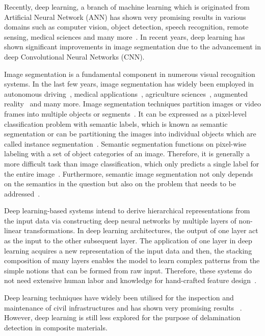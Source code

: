 Recently, deep learning, a branch of machine learning which is originated from Artificial Neural Network (ANN) has shown very promising results in various domains such as computer vision, object detection, speech recognition, remote sensing, medical sciences and many more~\cite{deng2014deep, mohanty2016using, zhang2020well, pashaei2020review}. In recent years, deep learning has shown significant improvements in image segmentation due to the advancement in deep Convolutional Neural Networks (CNN). 

Image segmentation is a fundamental component in numerous visual recognition systems. In the last few years, image segmentation has widely been employed in autonomous driving~\cite{zhang2013understanding, cordts2016cityscapes, ros2016synthia, li2018real}, medical applications~\cite{taghanaki2020deep}, agriculture sciences~\cite{milioto2018real}, augmented reality~\cite{miksik2015semantic} and many more. Image segmentation techniques partition images or video frames into multiple objects or segments~\cite{szeliski2010computer}. It can be expressed as a pixel-level classification problem with semantic labels, which is known as semantic segmentation or can be partitioning the images into individual objects which are called instance segmentation~\cite{minaee2020image}. Semantic segmentation functions on pixel-wise labeling with a set of object categories of an image. Therefore, it is generally a more difficult task than image classification, which only predicts a single label for the entire image~\cite{minaee2020image}. Furthermore, semantic image segmentation not only depends on the semantics in the question but also on the problem that needs to be addressed~\cite{ghosh2019understanding}.

Deep learning-based systems intend to derive hierarchical representations from the input data via constructing deep neural networks by multiple layers of non-linear transformations. In deep learning architectures, the output of one layer act as the input to the other subsequent layer. The application of one layer in deep learning acquires a new representation of the input data and then, the stacking composition of many layers enables the model to learn complex patterns from the simple notions that can be formed from raw input. Therefore, these systems do not need extensive human labor and knowledge for hand-crafted feature design~\cite{zhao2019deep, yuan2020machine}.

Deep learning techniques have widely been utilised for the inspection and maintenance of civil infrastructures and has shown very promising results ~\cite{cha2017deep, lin2017structural, liu2019computer}. However, deep learning is still less explored for the purpose of delamination detection in composite materials.   

